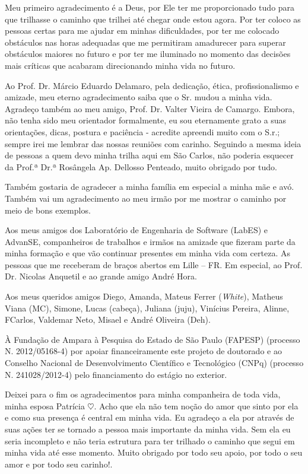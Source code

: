 Meu primeiro agradecimento é a Deus, por Ele ter me proporcionado tudo para que trilhasse o caminho que trilhei até chegar onde estou agora. Por ter coloco as pessoas certas para me ajudar em minhas dificuldades, por ter me colocado obstáculos nas horas adequadas que me permitiram amadurecer para superar obstáculos maiores no futuro e por ter me iluminado no momento das decisões mais críticas que acabaram direcionando minha vida no futuro.

Ao Prof. Dr. Márcio Eduardo Delamaro, pela dedicação, ética, profissionalismo e amizade, meu eterno agradecimento saiba que o Sr. mudou a minha vida. Agradeço também ao meu amigo, Prof. Dr. Valter Vieira de Camargo. Embora, não tenha sido meu orientador formalmente, eu sou eternamente grato a suas orientações, dicas, postura e paciência - acredite apreendi muito com o S.r.; sempre irei me lembrar das nossas reuniões com carinho. Seguindo a mesma ideia de pessoas a quem devo minha trilha aqui em São Carlos, não poderia esquecer da Prof.ª Dr.ª Rosângela Ap. Dellosso Penteado, muito obrigado por tudo.

Também gostaria de agradecer a minha família em especial a minha mãe e avó. Também vai um agradecimento ao meu irmão por me mostrar o caminho por meio de bons exemplos.

Aos meus amigos dos Laboratório de Engenharia de Software (LabES) e AdvanSE, companheiros de trabalhos e irmãos na amizade que fizeram parte da minha formação e que vão continuar presentes em minha vida com certeza. As pessoas que me receberam de braços abertos em Lille – FR. Em especial, ao Prof. Dr. Nicolas Anquetil e ao grande amigo André Hora. 

Aos meus queridos amigos Diego, Amanda, Mateus Ferrer (\textit{White}), Matheus Viana (MC), Simone, Lucas (cabeça), Juliana (juju), Vinícius Pereira, Alinne, FCarlos, Valdemar Neto, Misael e André Oliveira (Deh).

À Fundação de Ampara à Pesquisa do Estado de São Paulo (FAPESP) (processo N. 2012/05168-4) por apoiar financeiramente este projeto de doutorado e ao Conselho Nacional de Desenvolvimento Científico e Tecnológico (CNPq) (processo N. 241028/2012-4) pelo financiamento do estágio no exterior.

Deixei para o fim os agradecimentos para minha companheira de toda vida, minha esposa Patrícia $\heartsuit$. Acho que ela não tem noção do amor que sinto por ela e como sua presença é central em minha vida. Eu agradeço a ela por através de suas ações ter se tornado a pessoa mais importante da minha vida. Sem ela eu seria incompleto e não teria estrutura para ter trilhado o caminho que segui em minha vida até esse momento. Muito obrigado por todo seu apoio, por todo o seu amor e por todo seu carinho!.

